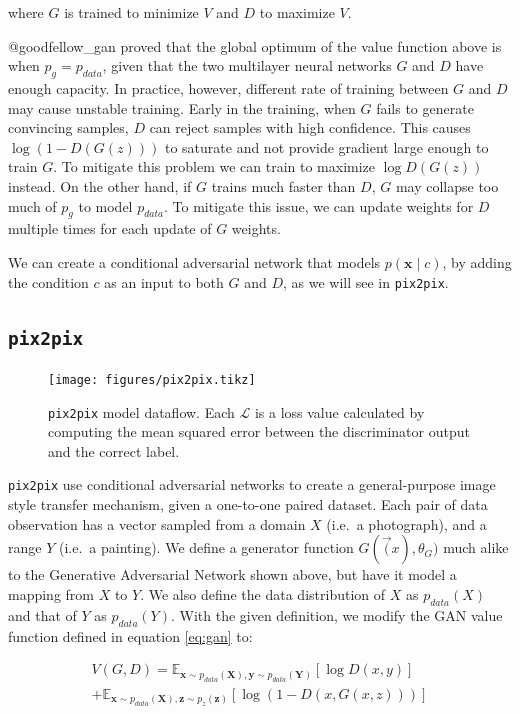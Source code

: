 \documentclass[12pt,a4paper,]{report}
\begin{document}
where \(G\) is trained to minimize \(V\) and \(D\) to maximize \(V\).

@goodfellow\_gan proved that the global optimum of the value function
above is when \(p_g = p_{data}\), given that the two multilayer neural
networks \(G\) and \(D\) have enough capacity. In practice, however,
different rate of training between \(G\) and \(D\) may cause unstable
training. Early in the training, when \(G\) fails to generate convincing
samples, \(D\) can reject samples with high confidence. This causes
\(\log (1 - D(G(z)))\) to saturate and not provide gradient large enough
to train \(G\). To mitigate this problem we can train to maximize
\(\log D(G(z))\) instead. On the other hand, if \(G\) trains much faster
than \(D\), \(G\) may collapse too much of \(p_g\) to model
\(p_{data}\). To mitigate this issue, we can update weights for \(D\)
multiple times for each update of \(G\) weights.

We can create a conditional adversarial network that models
\(p(\mathbf{x} \mid c)\), by adding the condition \(c\) as an input to
both \(G\) and \(D\), as we will see in \texttt{pix2pix}.

\hypertarget{pix2pix}{%
\subsection{\texorpdfstring{\texttt{pix2pix}}{pix2pix}}\label{pix2pix}}

\begin{figure}[h]
    \texttt{[image: figures/pix2pix.tikz]}
\centering
\caption{\texttt{pix2pix} model dataflow. Each $\mathcal{L}$ is a loss value calculated by computing the mean squared error between the discriminator output and the correct label. \label{fig:pix2pix}}
\end{figure}

\texttt{pix2pix} use conditional adversarial networks to create a
general-purpose image style transfer mechanism, given a one-to-one
paired dataset. Each pair of data observation has a vector sampled from
a domain \(X\) (i.e.~a photograph), and a range \(Y\) (i.e.~a painting).
We define a generator function \(G(\vec(x), \theta_G)\) much alike to
the Generative Adversarial Network shown above, but have it model a
mapping from \(X\) to \(Y\). We also define the data distribution of
\(X\) as \(p_{data}(X)\) and that of \(Y\) as \(p_{data}(Y)\). With the
given definition, we modify the GAN value function defined in equation
\ref{eq:gan} to:

\begin{multline}
    V(G, D) = \mathbb{E}_{\mathbf{x} \sim p_{data}(\mathbf{X}), \mathbf{y} \sim p_{data}(\mathbf{Y})}[\log D(x, y)] \\ +  \mathbb{E}_{\mathbf{x} \sim p_{data}(\mathbf{X}), \mathbf{z} \sim p_{z}(\mathbf{z})}[\log (1 - D(x, G(x, z)))] \label{eq:pix2pix}
\end{multline}
\end{document}
